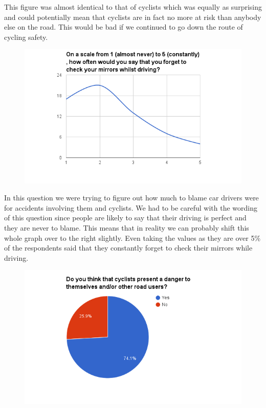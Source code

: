 \documentclass[a4paper]{report}
\begin{document}
{\begin{figure}[H]
\end{figure}
This figure was almost identical to that of cyclists which was equally as surprising and could potentially mean that cyclists are in fact no more at risk than anybody else on the road. This would be bad if we continued to go down the route of cycling safety.
 
\begin{figure}[H]
\centering
\includegraphics[scale=0.6]{figures/research_report/questionnaires/cars_3}
\end{figure}
In this question we were trying to figure out how much to blame car drivers were for accidents involving them and cyclists. We had to be careful with the wording of this question since people are likely to say that their driving is perfect and they are never to blame. This means that in reality we can probably shift this whole graph over to the right slightly. Even taking the values as they are over 5\% of the respondents said that they constantly forget to check their mirrors while driving.
\begin{figure}[H]
\centering
\includegraphics[scale=0.6]{figures/research_report/questionnaires/cars_2}

\end{figure}}
\end{document}
